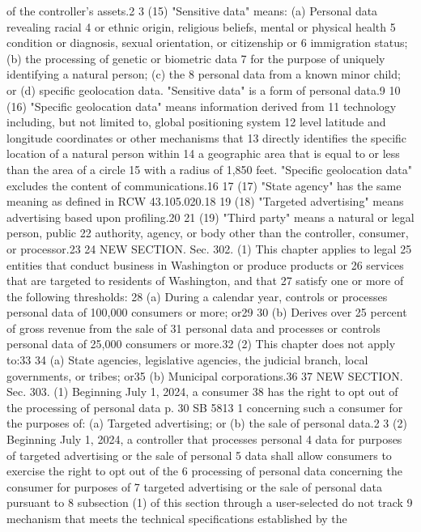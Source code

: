 of the controller's assets.2
3 (15) "Sensitive data" means: (a) Personal data revealing racial
4 or ethnic origin, religious beliefs, mental or physical health
5 condition or diagnosis, sexual orientation, or citizenship or
6 immigration status; (b) the processing of genetic or biometric data
7 for the purpose of uniquely identifying a natural person; (c) the
8 personal data from a known minor child; or (d) specific geolocation
data. "Sensitive data" is a form of personal data.9
10 (16) "Specific geolocation data" means information derived from
11 technology including, but not limited to, global positioning system
12 level latitude and longitude coordinates or other mechanisms that
13 directly identifies the specific location of a natural person within
14 a geographic area that is equal to or less than the area of a circle
15 with a radius of 1,850 feet. "Specific geolocation data" excludes the
content of communications.16
17 (17) "State agency" has the same meaning as defined in RCW
43.105.020.18
19 (18) "Targeted advertising" means advertising based upon
profiling.20
21 (19) "Third party" means a natural or legal person, public
22 authority, agency, or body other than the controller, consumer, or
processor.23
24 NEW SECTION. Sec. 302. (1) This chapter applies to legal
25 entities that conduct business in Washington or produce products or
26 services that are targeted to residents of Washington, and that
27 satisfy one or more of the following thresholds:
28 (a) During a calendar year, controls or processes personal data
of 100,000 consumers or more; or29
30 (b) Derives over 25 percent of gross revenue from the sale of
31 personal data and processes or controls personal data of 25,000
consumers or more.32
(2) This chapter does not apply to:33
34 (a) State agencies, legislative agencies, the judicial branch,
local governments, or tribes; or35
(b) Municipal corporations.36
37 NEW SECTION. Sec. 303. (1) Beginning July 1, 2024, a consumer
38 has the right to opt out of the processing of personal data
p. 30 SB 5813
1 concerning such a consumer for the purposes of: (a) Targeted
advertising; or (b) the sale of personal data.2
3 (2) Beginning July 1, 2024, a controller that processes personal
4 data for purposes of targeted advertising or the sale of personal
5 data shall allow consumers to exercise the right to opt out of the
6 processing of personal data concerning the consumer for purposes of
7 targeted advertising or the sale of personal data pursuant to
8 subsection (1) of this section through a user-selected do not track
9 mechanism that meets the technical specifications established by the
